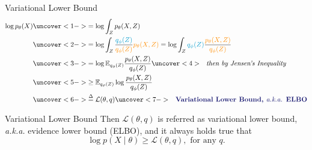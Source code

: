 \documentclass{beamer}
\begin{document}
\begin{frame}{Variational Lower Bound}
\begin{align*}
    \log p_{\mathbf{\theta}}(X)
    &\uncover<1->{=\log\int_{Z} p_{\theta}(X,Z)}\\
    &\uncover<2->{
    =\log\int_{Z} \frac{\textcolor{DeepSkyBlue3}{q_{\phi}(Z)}}{\textcolor{DarkOrange}{q_{\phi}(Z)}}\textcolor{DarkOrange}{p_{\theta}(X,Z)}
    =\log\int_{Z} \textcolor{DeepSkyBlue3}{q_{\phi}(Z)}\frac{\textcolor{DarkOrange}{p_{\theta}(X,Z)}}{\textcolor{DarkOrange}{q_{\phi}(Z)}}}\\
    &\uncover<3->{
    =\log\mathbb{E}_{q_{\phi}(Z)}\frac{p_{\theta}(X,Z)}{q_{\phi}(Z)}} \uncover<4>{\textit{~~then by Jensen's Inequality}}\\
    &\uncover<5->{
    \geq\mathbb{E}_{q_{\phi}(Z)}\log\frac{p_{\theta}(X,Z)}{q_{\phi}(Z)}}\\
    &\uncover<6->{
    \overset{\Delta}{=}\mathcal{L}(\theta,q)}
    \uncover<7->{
    \text{\bf\textcolor{MidnightBlue}{~~Variational Lower Bound, {\it a.k.a.} ELBO}}}
\end{align*}
\end{frame}
\begin{frame}{Variational Lower Bound}%
Then $\mathcal{L}(\theta,q)$ is referred as \textcolor{DeepPink3}{variational lower bound}, \textit{a.k.a.} evidence lower bound (ELBO), and it always holds true that
$$\log p(X\mid\theta)\geq\mathcal{L}(\theta,q), \text{ for any } q.$$

\end{frame}
\end{document}

